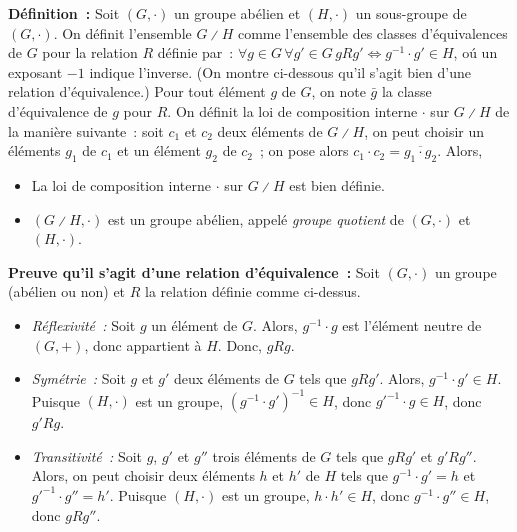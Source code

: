 \noindent\textbf{Définition :} Soit $(G, \cdot)$ un groupe abélien et $(H, \cdot)$ un sous-groupe de $(G, \cdot)$.
    On définit l'ensemble $G \divslash H$ comme l'ensemble des classes d'équivalences de $G$ pour la relation $R$ définie par : $\forall g \in G \, \forall g' \in G \, g R g' \Leftrightarrow g^{-1} \cdot g' \in H$, oú un exposant $-1$ indique l'inverse. 
    (On montre ci-dessous qu'il s'agit bien d'une relation d'équivalence.)
    Pour tout élément $g$ de $G$, on note $\bar{g}$ la classe d'équivalence de $g$ pour $R$.
    On définit la loi de composition interne $\cdot$ sur $G \divslash H$ de la manière suivante : soit $c_1$ et $c_2$ deux éléments de $G \divslash H$, on peut choisir un éléments $g_1$ de $c_1$ et un élément $g_2$ de $c_2$ ; on pose alors $c_1 \cdot c_2 = \overline{g_1 \cdot g_2}$. 
    Alors, 
    \begin{itemize}[nosep]
        \item La loi de composition interne $\cdot$ sur $G \divslash H$ est bien définie.
        \item $(G \divslash H, \cdot)$ est un groupe abélien, appelé \textit{groupe quotient} de $(G, \cdot)$ et $(H, \cdot)$.
    \end{itemize}

\medskip

\noindent\textbf{Preuve qu'il s'agit d'une relation d'équivalence :} 
Soit $(G, \cdot)$ un groupe (abélien ou non) et $R$ la relation définie comme ci-dessus.
\begin{itemize}[nosep]
    \item \emph{Réflexivité :} Soit $g$ un élément de $G$.
        Alors, $g^{-1} \cdot g$ est l'élément neutre de $(G, +)$, donc appartient à $H$.
        Donc, $g R g$.
    \item \emph{Symétrie :} Soit $g$ et $g'$ deux éléments de $G$ tels que $g R g'$.
        Alors, $g^{-1} \cdot g' \in H$.
        Puisque $(H, \cdot)$ est un groupe, $(g^{-1} \cdot g')^{-1} \in H$, donc $g'^{-1} \cdot g \in H$, donc $g' R g$.
    \item \emph{Transitivité :} Soit $g$, $g'$ et $g''$ trois éléments de $G$ tels que $g R g'$ et $g' R g''$.
        Alors, on peut choisir deux éléments $h$ et $h'$ de $H$ tels que $g^{-1} \cdot g' = h$ et $g'^{-1} \cdot g'' = h'$.
        Puisque $(H, \cdot)$ est un groupe, $h \cdot h' \in H$, donc $g^{-1} \cdot g'' \in H$, donc $g R g''$.
\end{itemize}

\done

\medskip

